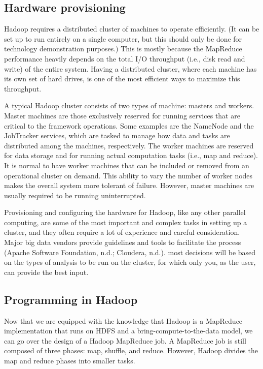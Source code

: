 \documentclass[]{krantz}
\begin{document}
\subsection{Hardware provisioning}\label{hardware-provisioning}

Hadoop requires a distributed cluster of machines to operate
efficiently. (It can be set up to run entirely on a single computer, but
this should only be done for technology demonstration purposes.) This is
mostly because the MapReduce performance heavily depends on the total
I/O throughput (i.e., disk read and write) of the entire system. Having
a distributed cluster, where each machine has its own set of hard
drives, is one of the most efficient ways to maximize this throughput.

A typical Hadoop cluster consists of two types of machine: masters and
workers. Master machines are those exclusively reserved for running
services that are critical to the framework operations. Some examples
are the NameNode and the JobTracker services, which are tasked to manage
how data and tasks are distributed among the machines, respectively. The
worker machines are reserved for data storage and for running actual
computation tasks (i.e., map and reduce). It is normal to have worker
machines that can be included or removed from an operational cluster on
demand. This ability to vary the number of worker nodes makes the
overall system more tolerant of failure. However, master machines are
usually required to be running uninterrupted.

Provisioning and configuring the hardware for Hadoop, like any other
parallel computing, are some of the most important and complex tasks in
setting up a cluster, and they often require a lot of experience and
careful consideration. Major big data vendors provide guidelines and
tools to facilitate the process (Apache Software Foundation, n.d.;
Cloudera, n.d.). most decisions will be based on the types of analysis
to be run on the cluster, for which only you, as the user, can provide
the best input.

\subsection{Programming in Hadoop}\label{programming-in-hadoop}

Now that we are equipped with the knowledge that Hadoop is a MapReduce
implementation that runs on HDFS and a bring-compute-to-the-data model,
we can go over the design of a Hadoop MapReduce job. A MapReduce job is
still composed of three phases: map, shuffle, and reduce. However,
Hadoop divides the map and reduce phases into smaller tasks.
\end{document}
